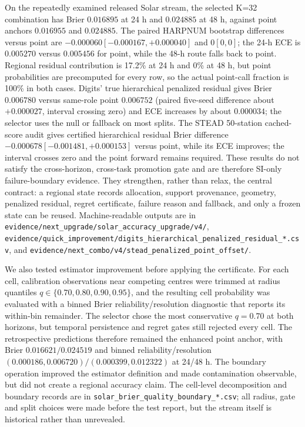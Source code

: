 \documentclass[11pt,a4paper]{article}
\numberwithin{equation}{section}
\theoremstyle{definition}\newtheorem{definition}[theorem]{Definition}
\theoremstyle{remark}\newtheorem{remark}[theorem]{Remark}
\begin{document}
On the repeatedly examined released Solar stream, the selected K=32 combination has Brier $0.016895$ at 24 h and $0.024885$ at 48 h, against point anchors $0.016955$ and $0.024885$. The paired HARPNUM bootstrap differences versus point are $-0.000060[-0.000167,+0.000040]$ and $0[0,0]$; the 24-h ECE is $0.005270$ versus $0.005456$ for point, while the 48-h route falls back to point. Regional residual contribution is 17.2\% at 24 h and 0\% at 48 h, but point probabilities are precomputed for every row, so the actual point-call fraction is 100\% in both cases. Digits' true hierarchical penalized residual gives Brier $0.006780$ versus same-role point $0.006752$ (paired five-seed difference about $+0.000027$, interval crossing zero) and ECE increases by about $0.000034$; the selector uses the null or fallback on most splits. The STEAD 50-station cached-score audit gives certified hierarchical residual Brier difference $-0.000678[-0.001481,+0.000153]$ versus point, while its ECE improves; the interval crosses zero and the point forward remains required. These results do not satisfy the cross-horizon, cross-task promotion gate and are therefore SI-only failure-boundary evidence. They strengthen, rather than relax, the central contract: a regional state records allocation, support provenance, geometry, penalized residual, regret certificate, failure reason and fallback, and only a frozen state can be reused. Machine-readable outputs are in \texttt{evidence/next\_upgrade/solar\_accuracy\_upgrade/v4/}, \texttt{evidence/quick\_improvement/digits\_hierarchical\_penalized\_residual\_*.csv}, and \texttt{evidence/next\_combo/v4/stead\_penalized\_point\_offset/}.

We also tested estimator improvement before applying the certificate. For each cell, calibration observations near competing centres were trimmed at radius quantiles $q\in\{0.70,0.80,0.90,0.95\}$, and the resulting cell probability was evaluated with a binned Brier reliability/resolution diagnostic that reports its within-bin remainder. The selector chose the most conservative $q=0.70$ at both horizons, but temporal persistence and regret gates still rejected every cell. The retrospective predictions therefore remained the enhanced point anchor, with Brier $0.016621/0.024519$ and binned reliability/resolution $(0.000186,0.006720)/(0.000399,0.012322)$ at 24/48 h. The boundary operation improved the estimator definition and made contamination observable, but did not create a regional accuracy claim. The cell-level decomposition and boundary records are in \texttt{solar\_brier\_quality\_boundary\_*.csv}; all radius, gate and split choices were made before the test report, but the stream itself is historical rather than unrevealed.
\end{document}
